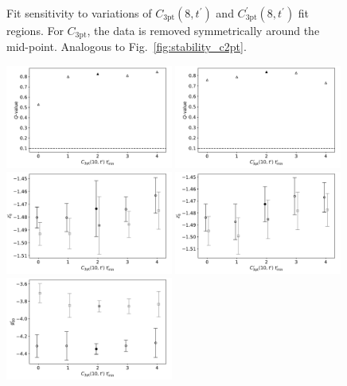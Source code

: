 \documentclass[prd,aps,twocolumn,superscriptaddress,tightenlines,nofootinbib,floatfix,preprintnumbers,10pt]{revtex4-1}
\begin{document}
\begin{figure}[h]
{		\caption{
			Fit sensitivity to variations of $C_{\mathrm{3pt}}(8,t^\prime)$ and $C^\prime_{\mathrm{3pt}}(8,t^\prime)$ fit regions. For $C_{\mathrm{3pt}}$, the data is removed symmetrically around the mid-point. Analogous to Fig.~\ref{fig:stability_c2pt}.}
		\label{fig:stability_c3pt8}
}\end{figure}

\newpage
\begin{figure}[h]{
		\includegraphics[width=0.49\textwidth]{plots/figures/3296_gV10_Q.pdf}
		\includegraphics[width=0.49\textwidth]{plots/figures/3296_dgV10_Q.pdf}
		\includegraphics[width=0.49\textwidth]{plots/figures/3296_gV10_dZ0.pdf}
		\includegraphics[width=0.49\textwidth]{plots/figures/3296_dgV10_dZ0.pdf}
		\includegraphics[width=0.49\textwidth]{plots/figures/3296_gV10_dgV.pdf}
}
\end{figure}
\end{document}
